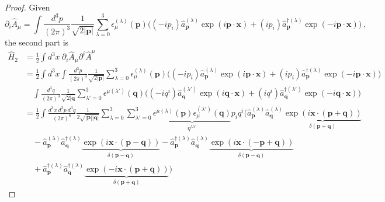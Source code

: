 \begin{proof}
        Given 
        \begin{equation*}
            \partial_i \hat A_\mu = \int \frac{d^3 p}{(2\pi)^3} \frac{1}{\sqrt{2 |\mathbf p|}} \sum_{\lambda=0}^{3} \epsilon_\mu^{(\lambda)} (\mathbf p) \Big ( (- i p_i )\hat a_{\mathbf p}^{(\lambda)} \exp(i \mathbf p \cdot \mathbf x) + (i p_i)\hat a_{\mathbf p}^{\dagger (\lambda)}  \exp(- i \mathbf p \cdot \mathbf x) \Big) ~,
        \end{equation*}
        the second part is
        \begin{equation*}
        \begin{aligned}
            \hat H_2 & = \frac{1}{2} \int d^3 x ~ \partial_i \hat A_\mu \partial^i \hat A^\mu \\ & = \frac{1}{2} \int d^3 x \int \frac{d^3 p}{(2\pi)^3} \frac{1}{\sqrt{2 |\mathbf p|}} \sum_{\lambda=0}^{3} \epsilon_\mu^{(\lambda)} (\mathbf p) \Big ( (- i p_i ) \hat a_{\mathbf p}^{(\lambda)} \exp(i \mathbf p \cdot \mathbf x) + (i p_i)\hat a_{\mathbf p}^{\dagger (\lambda)}  \exp(- i \mathbf p \cdot \mathbf x) \Big) \\ & \quad \int \frac{d^3 q}{(2\pi)^3} \frac{1}{\sqrt{2 |\mathbf q}} \sum_{\lambda'=0}^{3} \epsilon^{\mu(\lambda')} (\mathbf q) \Big ( (- i q^i )\hat a_{\mathbf q}^{(\lambda')} \exp(i \mathbf q \cdot \mathbf x) + (i q^i)\hat a_{\mathbf q}^{\dagger (\lambda')} \exp(- i \mathbf q \cdot \mathbf x) \Big) \\ & = \frac{1}{2} \int \frac{d^3 x ~ d^3 p ~ d^3 q}{(2\pi)^6} \frac{1}{2\sqrt{|\mathbf p| |\mathbf q|}} \sum_{\lambda=0}^{3} \sum_{\lambda'=0}^{3} \underbrace{\epsilon^{\mu(\lambda)} (\mathbf p) \epsilon_{\mu}^{(\lambda')} (\mathbf q)}_{\eta^{\lambda \lambda'}} p_i q^i ( \hat a_{\mathbf p}^{(\lambda)} \hat a_{\mathbf q}^{(\lambda)} \underbrace{\exp(i  \mathbf x \cdot (\mathbf p + \mathbf q)) }_{\delta(\mathbf p + \mathbf q)} \\ & \quad - \hat a_{\mathbf p}^{(\lambda)}\hat a_{\mathbf q}^{\dagger (\lambda)} \underbrace{\exp(i \mathbf x \cdot (\mathbf p - \mathbf q)) }_{\delta(\mathbf p - \mathbf q)} - \hat a_{\mathbf p}^{\dagger (\lambda)} \hat a_{\mathbf q}^{(\lambda)} \underbrace{\exp( i  \mathbf x \cdot ( -\mathbf p + \mathbf q)) }_{\delta(\mathbf p - \mathbf q)} \\ & \quad + \hat a_{\mathbf p}^{\dagger (\lambda)} \hat a_{\mathbf q}^{\dagger (\lambda)} \underbrace{\exp(- i  \mathbf x \cdot (\mathbf p + \mathbf q)) }_{\delta(\mathbf p + \mathbf q)})
        \end{aligned}
        \end{equation*}

\end{proof}

